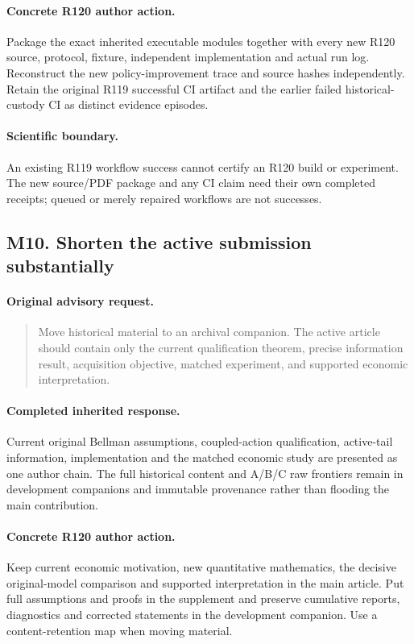 \paragraph{Concrete R120 author action.}
Package the exact inherited executable modules together with every new R120 source, protocol, fixture, independent implementation and actual run log. Reconstruct the new policy-improvement trace and source hashes independently. Retain the original R119 successful CI artifact and the earlier failed historical-custody CI as distinct evidence episodes.
\paragraph{Scientific boundary.}
An existing R119 workflow success cannot certify an R120 build or experiment. The new source/PDF package and any CI claim need their own completed receipts; queued or merely repaired workflows are not successes.

\subsection{M10. Shorten the active submission substantially}
\label{response120:M10}
\paragraph{Original advisory request.}
\begin{quote}
Move historical material to an archival companion. The active article should contain only the current qualification theorem, precise information result, acquisition objective, matched experiment, and supported economic interpretation.
\end{quote}
\paragraph{Completed inherited response.}
Current original Bellman assumptions, coupled-action qualification, active-tail information, implementation and the matched economic study are presented as one author chain. The full historical content and A/B/C raw frontiers remain in development companions and immutable provenance rather than flooding the main contribution.
\paragraph{Concrete R120 author action.}
Keep current economic motivation, new quantitative mathematics, the decisive original-model comparison and supported interpretation in the main article. Put full assumptions and proofs in the supplement and preserve cumulative reports, diagnostics and corrected statements in the development companion. Use a content-retention map when moving material.
